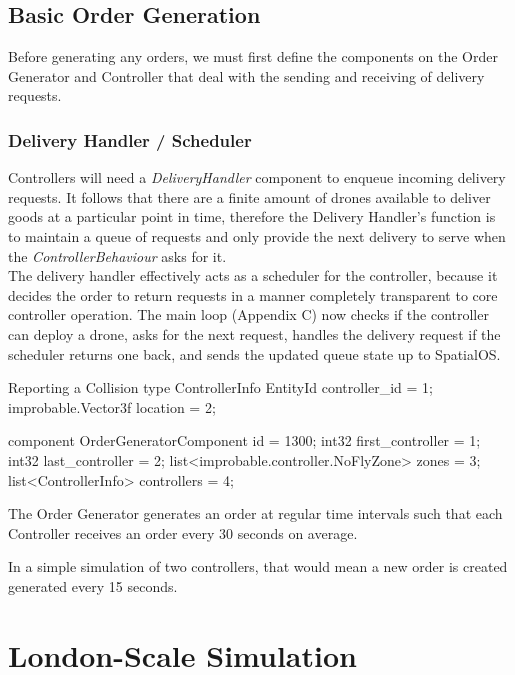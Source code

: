 \documentclass[a4paper,12pt,titlepage]{article}
\begin{document}
\subsection{Basic Order Generation}
Before generating any orders, we must first define the components on the Order Generator and Controller that deal with the sending and receiving of delivery requests.

\subsubsection{Delivery Handler / Scheduler}
Controllers will need a \textit{DeliveryHandler} component to enqueue incoming delivery requests. It follows that there are a finite amount of drones available to deliver goods at a particular point in time, therefore the Delivery Handler's function is to maintain a queue of requests and only provide the next delivery to serve when the \textit{ControllerBehaviour} asks for it.\\

The delivery handler effectively acts as a scheduler for the controller, because it decides the order to return requests in a manner completely transparent to core controller operation. The main loop (Appendix C) now checks if the controller can deploy a drone, asks for the next request, handles the delivery request if the scheduler returns one back, and sends the updated queue state up to SpatialOS.

\begin{sexylisting}[colback=white]{Reporting a Collision}
type ControllerInfo {
  EntityId controller_id = 1;
  improbable.Vector3f location = 2;
}

component OrderGeneratorComponent {
  id = 1300;
  int32 first_controller = 1;
  int32 last_controller = 2;
  list<improbable.controller.NoFlyZone> zones = 3;
  list<ControllerInfo> controllers = 4;
}
\end{sexylisting}

The Order Generator generates an order at regular time intervals such that each Controller receives an order every 30 seconds on average.

In a simple simulation of two controllers, that would mean a new order is created generated every 15 seconds.



\section{London-Scale Simulation}
\end{document}
